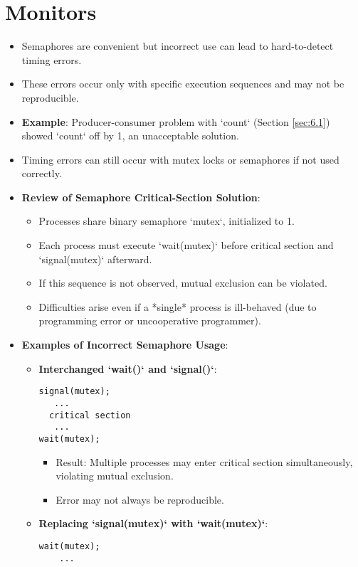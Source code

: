 \section{Monitors}
\begin{itemize}
    \item Semaphores are convenient but incorrect use can lead to hard-to-detect timing errors.
    \item These errors occur only with specific execution sequences and may not be reproducible.
    \item \textbf{Example}: Producer-consumer problem with `count` (Section \ref{sec:6.1}) showed `count` off by 1, an unacceptable solution.
    \item Timing errors can still occur with mutex locks or semaphores if not used correctly.
    \item \textbf{Review of Semaphore Critical-Section Solution}:
    \begin{itemize}
        \item Processes share binary semaphore `mutex`, initialized to 1.
        \item Each process must execute `wait(mutex)` before critical section and `signal(mutex)` afterward.
        \item If this sequence is not observed, mutual exclusion can be violated.
        \item Difficulties arise even if a *single* process is ill-behaved (due to programming error or uncooperative programmer).
    \end{itemize}
    \item \textbf{Examples of Incorrect Semaphore Usage}:
    \begin{itemize}
        \item \textbf{Interchanged `wait()` and `signal()`}:
\begin{verbatim}
signal(mutex);
   ...
  critical section
   ...
wait(mutex);
\end{verbatim}
        \begin{itemize}
            \item Result: Multiple processes may enter critical section simultaneously, violating mutual exclusion.
            \item Error may not always be reproducible.
        \end{itemize}
        \item \textbf{Replacing `signal(mutex)` with `wait(mutex)`}:
\begin{verbatim}
wait(mutex);
    ...

\end{verbatim}
\end{itemize}
\end{itemize}
